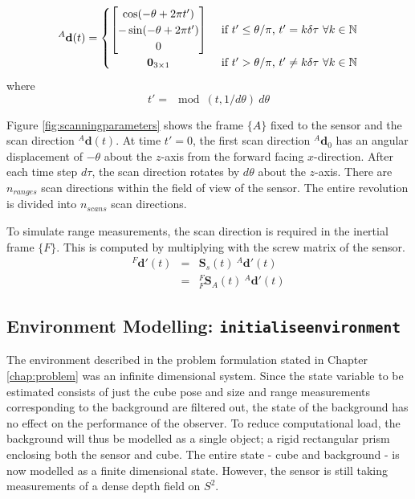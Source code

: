 \begin{equation}
^{A}\mathbf{d}(t) =
	\begin{cases} 
	      \hfill \begin{bmatrix}
	      		\cos(-\theta + 2\pi t') \\
	      		-\sin(-\theta + 2\pi t') \\
	      		0
	      	\end{bmatrix}    \hfill & \text{ if $t' \leq \theta/\pi$, $t' = k\delta\tau$  $\forall k \in \mathbb{N}$} \\
	      \hfill \mathbf{0}_{3 \times 1} \hfill & \text{ if $t' > \theta/\pi$, $t' \neq k\delta\tau$  $\forall k \in \mathbb{N}$} \\
	\end{cases} 
\end{equation}
where
\begin{equation}
t' = \mod(t,1/d\theta)\:d\theta
\end{equation}

Figure \ref{fig:scanningparameters} shows the frame $\{A\}$ fixed to the sensor and the scan direction ${^{A}\mathbf{d}(t)}$. At time $t' = 0$, the first scan direction ${^{A}\mathbf{d}_0}$ has an angular displacement of $-\theta$ about the $z$-axis from the forward facing $x$-direction. After each time step $d\tau$, the scan direction rotates by $d\theta$ about the $z$-axis. There are $n_{ranges}$ scan directions within the field of view of the sensor. The entire revolution is divided into $n_{scans}$ scan directions.


To simulate range measurements, the scan direction is required in the inertial frame $\{F\}$. This is computed by multiplying with the screw matrix of the sensor.
\begin{equation}
	\begin{array}{lcl}
	{^{F}\mathbf{d'}(t)} & = & \mathbf{S}_s(t)\:{^{A}\mathbf{d'}(t)} \\
	& = & {^{F}_{F}\mathbf{S}^{}_{A}(t)}\:{^{A}\mathbf{d'}(t)}
	\end{array}
\end{equation}

\subsection{Environment Modelling: \texttt{initialiseenvironment}}
The environment described in the problem formulation stated in Chapter \ref{chap:problem} was an infinite dimensional system. Since the state variable to be estimated consists of just the cube pose and size and range measurements corresponding to the background are filtered out, the state of the background has no effect on the performance of the observer. 
To reduce computational load, the background will thus be modelled as a single object; a rigid rectangular prism enclosing both the sensor and cube. 
The entire state - cube and background - is now modelled as a finite dimensional state. However, the sensor is still taking measurements of a dense depth field on $S^2$.

